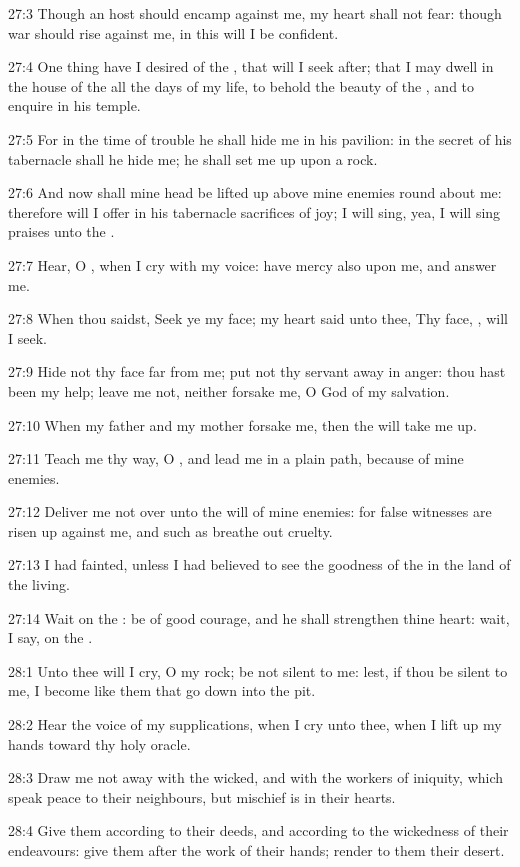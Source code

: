 27:3 Though an host should encamp against me, my heart shall not fear:
though war should rise against me, in this will I be confident.

27:4 One thing have I desired of the \LORD, that will I seek after;
that I may dwell in the house of the \LORD all the days of my life, to
behold the beauty of the \LORD, and to enquire in his temple.

27:5 For in the time of trouble he shall hide me in his pavilion: in
the secret of his tabernacle shall he hide me; he shall set me up upon
a rock.

27:6 And now shall mine head be lifted up above mine enemies round
about me: therefore will I offer in his tabernacle sacrifices of joy;
I will sing, yea, I will sing praises unto the \LORD.

27:7 Hear, O \LORD, when I cry with my voice: have mercy also upon me,
and answer me.

27:8 When thou saidst, Seek ye my face; my heart said unto thee, Thy
face, \LORD, will I seek.

27:9 Hide not thy face far from me; put not thy servant away in anger:
thou hast been my help; leave me not, neither forsake me, O God of my
salvation.

27:10 When my father and my mother forsake me, then the \LORD will take
me up.

27:11 Teach me thy way, O \LORD, and lead me in a plain path, because
of mine enemies.

27:12 Deliver me not over unto the will of mine enemies: for false
witnesses are risen up against me, and such as breathe out cruelty.

27:13 I had fainted, unless I had believed to see the goodness of the
\LORD in the land of the living.

27:14 Wait on the \LORD: be of good courage, and he shall strengthen
thine heart: wait, I say, on the \LORD.



28:1 Unto thee will I cry, O \LORD my rock; be not silent to me: lest,
if thou be silent to me, I become like them that go down into the pit.

28:2 Hear the voice of my supplications, when I cry unto thee, when I
lift up my hands toward thy holy oracle.

28:3 Draw me not away with the wicked, and with the workers of
iniquity, which speak peace to their neighbours, but mischief is in
their hearts.

28:4 Give them according to their deeds, and according to the
wickedness of their endeavours: give them after the work of their
hands; render to them their desert.

